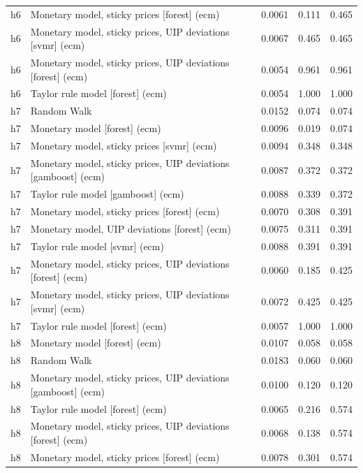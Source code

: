 \begin{ThreePartTable}
\begin{longtable}[t]{cp{5.5cm}ccc}
h6 & \raggedright Monetary model, sticky prices [forest] (ecm) & 0.0061 & 0.111 & 0.465\\
h6 & \raggedright Monetary model, sticky prices, UIP deviations [svmr] (ecm) & 0.0067 & 0.465 & 0.465\\
h6 & \raggedright Monetary model, sticky prices, UIP deviations [forest] (ecm) & 0.0054 & 0.961 & 0.961\\
h6 & \raggedright Taylor rule model [forest] (ecm) & 0.0054 & 1.000 & 1.000\\
\addlinespace
h7 & \raggedright Random Walk & 0.0152 & 0.074 & 0.074\\
h7 & \raggedright Monetary model [forest] (ecm) & 0.0096 & 0.019 & 0.074\\
h7 & \raggedright Monetary model, sticky prices [svmr] (ecm) & 0.0094 & 0.348 & 0.348\\
h7 & \raggedright Monetary model, sticky prices, UIP deviations [gamboost] (ecm) & 0.0087 & 0.372 & 0.372\\
h7 & \raggedright Taylor rule model [gamboost] (ecm) & 0.0088 & 0.339 & 0.372\\
h7 & \raggedright Monetary model, sticky prices [forest] (ecm) & 0.0070 & 0.308 & 0.391\\
h7 & \raggedright Monetary model, UIP deviations [forest] (ecm) & 0.0075 & 0.311 & 0.391\\
h7 & \raggedright Taylor rule model [svmr] (ecm) & 0.0088 & 0.391 & 0.391\\
h7 & \raggedright Monetary model, sticky prices, UIP deviations [forest] (ecm) & 0.0060 & 0.185 & 0.425\\
h7 & \raggedright Monetary model, sticky prices, UIP deviations [svmr] (ecm) & 0.0072 & 0.425 & 0.425\\
h7 & \raggedright Taylor rule model [forest] (ecm) & 0.0057 & 1.000 & 1.000\\
\addlinespace
h8 & \raggedright Monetary model [forest] (ecm) & 0.0107 & 0.058 & 0.058\\
h8 & \raggedright Random Walk & 0.0183 & 0.060 & 0.060\\
h8 & \raggedright Monetary model, sticky prices, UIP deviations [gamboost] (ecm) & 0.0100 & 0.120 & 0.120\\
h8 & \raggedright Taylor rule model [forest] (ecm) & 0.0065 & 0.216 & 0.574\\
h8 & \raggedright Monetary model, sticky prices, UIP deviations [forest] (ecm) & 0.0068 & 0.138 & 0.574\\
h8 & \raggedright Monetary model, sticky prices [forest] (ecm) & 0.0078 & 0.301 & 0.574\\

\end{longtable}
\end{ThreePartTable}
